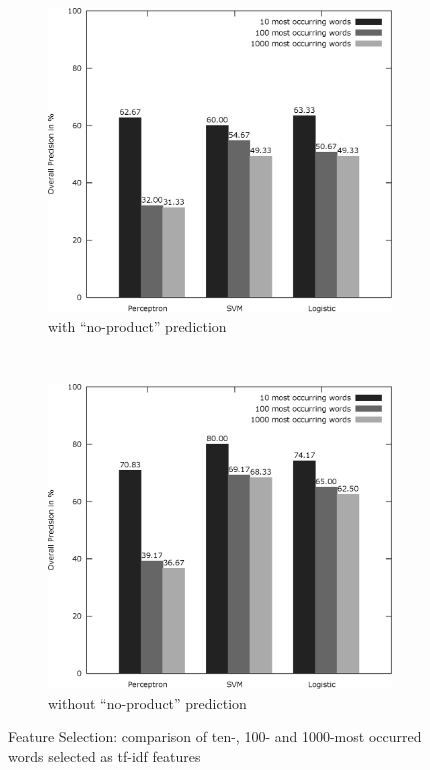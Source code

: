 \begin{figure}
	\centering
	\begin{subfigure}[t]{0.5\textwidth}
		\includegraphics[width=\textwidth]{figures/product_feature_selection_with_none.eps}
		\caption{with ``no-product'' prediction}
	\end{subfigure}~
	\begin{subfigure}[t]{0.5\textwidth}
		\includegraphics[width=\textwidth]{figures/product_feature_selection_without_none.eps}
		\caption{without ``no-product'' prediction}
	\end{subfigure}
	\caption{Feature Selection: comparison of ten-, 100- and 1000-most occurred words selected as tf-idf features}
	\label{fig:product_feature_selection}
\end{figure}

